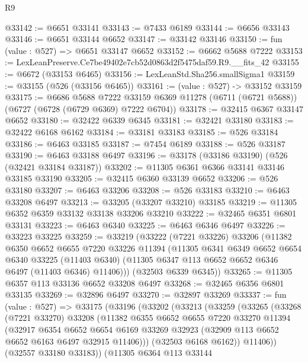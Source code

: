 \begin{lexlean}{R9}
\begin{coremodule}
@33142 := @6651 @33141
@33143 := @7433 @6189
@33144 := @6656 @33143
@33146 := @6651 @33144 @6652
@33147 := @33142 @33146
@33150 := fun (value : @527) => @6651 @33147 @6652
@33152 := @6662 @5688 @7222
@33153 := LexLeanPreserve.Ce7be49402e7cb52d0863d2f5475daf59.R9.__fits_42
@33155 := @6672 (@33153 @6465)
@33156 := LexLeanStd.Sha256.smallSigma1
@33159 := @33155 (@526 (@33156 @6465))
@33161 := (value : @527) -> @33152 @33159
@33175 := @6686
    @5688
    @7222
    @33159
    @6369
    @11278
    (@6711 (@6721 @5688))
    (@6727 (@6728 (@6729 @6369) @7222 @6704))
@33178 := @32415 @6367 @33147 @6652
@33180 := @32422 @6339 @6345
@33181 := @32421 @33180
@33183 := @32422 @6168 @6162
@33184 := @33181 @33183
@33185 := @526 @33184
@33186 := @6463 @33185
@33187 := @7454 @6189
@33188 := @526 @33187
@33190 := @6463 @33188 @6497
@33196 := @33178 (@33186 @33190) (@526 (@32421 @33184 @33187))
@33202 := @11305 @6361 @6366 @33141 @33146 @33185 @33190
@33205 := @32415 @6360 @33139 @6652
@33206 := @526 @33180
@33207 := @6463 @33206
@33208 := @526 @33183
@33210 := @6463 @33208 @6497
@33213 := @33205 (@33207 @33210) @33185
@33219 := @11305 @6352 @6359 @33132 @33138 @33206 @33210
@33222 := @32465 @6351 @6801 @33131
@33223 := @6463 @6340
@33225 := @6463 @6346 @6497
@33226 := @33223 @33225
@33259 := @33219
    (@33222
      (@7221 @33226)
      @33206
      (@11382
        @6350
        @6652
        @6655
        @7220
        @33226
        @11394
        (@11305
          @6341
          @6349
          @6652
          @6654
          @6340
          @33225
          (@11403 @6340)
          (@11305 @6347 @113 @6652 @6652 @6346 @6497 (@11403 @6346) @11406)))
      (@32503 @6339 @6345))
@33265 := @11305 @6357 @113 @33136 @6652 @33208 @6497
@33268 := @32465 @6356 @6801 @33135
@33269 := @32896 @6497
@33270 := @32897 @33269
@33337 := fun (value : @527) =>
  @33175
    (@33196
      (@33202
        (@33213
          (@33259
            (@33265
              (@33268
                (@7221 @33270)
                @33208
                (@11382
                  @6355
                  @6652
                  @6655
                  @7220
                  @33270
                  @11394
                  (@32917
                    @6354
                    @6652
                    @6654
                    @6169
                    @33269
                    @32923
                    (@32909 @113 @6652 @6652 @6163 @6497 @32915 @11406)))
                (@32503 @6168 @6162))
              @11406))
          (@32557 @33180 @33183))
        (@11305
          @6364
          @113
          @33144

\end{coremodule}
\end{lexlean}
